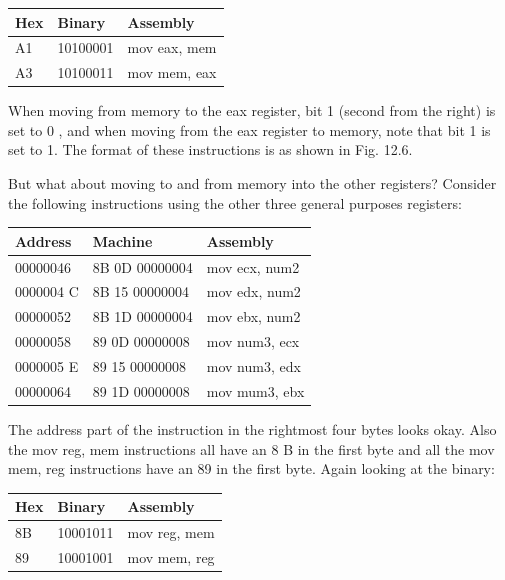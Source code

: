 \documentclass[10pt]{book}
\begin{document}
\begin{center}
\begin{tabular}{|l|l|l|}
\hline
Hex & Binary & Assembly \\
\hline
A1 & 10100001 & mov eax, mem \\
\hline
A3 & 10100011 & mov mem, eax \\
\hline
\end{tabular}
\end{center}

When moving from memory to the eax register, bit 1 (second from the right) is set to 0 , and when moving from the eax register to memory, note that bit 1 is set to 1. The format of these instructions is as shown in Fig. 12.6.

But what about moving to and from memory into the other registers? Consider the following instructions using the other three general purposes registers:

\begin{center}
\begin{tabular}{|l|l|l|}
\hline
Address & Machine & Assembly \\
\hline
00000046 & 8B 0D 00000004 & mov ecx, num2 \\
\hline
0000004 C & 8B 15 00000004 & mov edx, num2 \\
\hline
00000052 & 8B 1D 00000004 & mov ebx, num2 \\
\hline
00000058 & 89 0D 00000008 & mov num3, ecx \\
\hline
0000005 E & 89 15 00000008 & mov num3, edx \\
\hline
00000064 & 89 1D 00000008 & mov mum3, ebx \\
\hline
\end{tabular}
\end{center}

The address part of the instruction in the rightmost four bytes looks okay. Also the mov reg, mem instructions all have an 8 B in the first byte and all the mov mem, reg instructions have an 89 in the first byte. Again looking at the binary:

\begin{center}
\begin{tabular}{|l|l|l|}
\hline
Hex & Binary & Assembly \\
\hline
8B & 10001011 & mov reg, mem \\
\hline
89 & 10001001 & mov mem, reg \\
\hline
\end{tabular}
\end{center}
\end{document}
